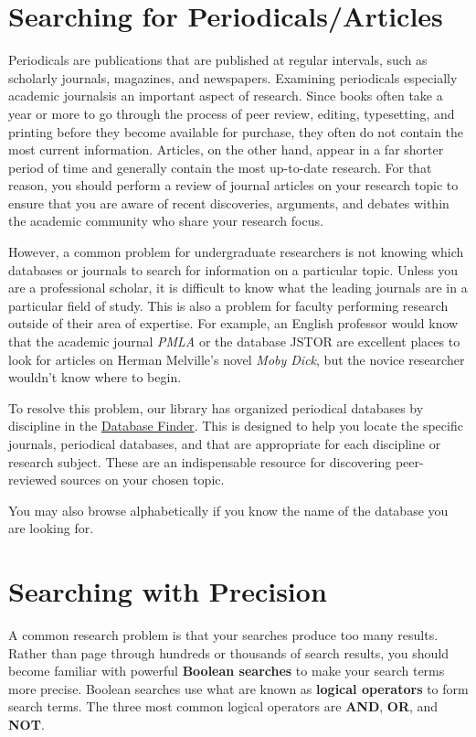 \section{Searching for Periodicals/Articles}

Periodicals are publications that are published at regular intervals, such as
scholarly journals, magazines, and newspapers. Examining periodicals\textemdash
especially academic journals\textemdash is an important aspect of research.
Since books often take a year or more to go through the process of peer review,
editing, typesetting, and printing before they become available for purchase,
they often do not contain the most current information. Articles, on the other
hand, appear in a far shorter period of time and generally contain the most
up-to-date research. For that reason, you should perform a review of journal
articles on your research topic to ensure that you are aware of recent
discoveries, arguments, and debates within the academic community who share
your research focus.

However, a common problem for undergraduate researchers is not knowing which
databases or journals to search for information on a particular topic. Unless
you are a professional scholar, it is difficult to know what the leading
journals are in a particular field of study. This is also a problem for faculty performing research outside of their area of expertise. For example, an English professor would know that the academic journal \emph{PMLA} or the database JSTOR are excellent places to look for articles on Herman Melville's novel \emph{Moby
Dick}, but the novice researcher wouldn't know where to begin.

To resolve this problem, our library has organized periodical databases by
discipline in the \href{https://researchguides.dartmouth.edu/az.php}{Database
Finder}. This is designed to help you locate the specific journals, periodical
databases, and that are appropriate for each discipline or  research subject.
These are an indispensable resource for discovering  peer-reviewed sources on
your chosen topic.

You may also browse alphabetically if you know the name of the database you are
looking for.

\section{Searching with Precision}

A common research problem is that your searches produce too many results.
Rather than page through hundreds or thousands of search results, you should
become familiar with powerful \textbf{Boolean searches} to make your search
terms more precise. Boolean searches use what are known as \textbf{logical
operators} to form search terms. The three most common logical operators are
\textbf{AND}, \textbf{OR}, and \textbf{NOT}.

